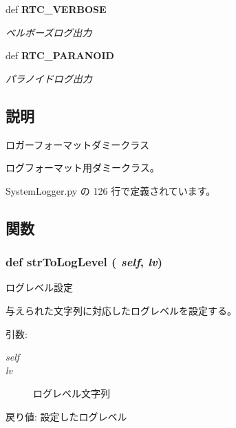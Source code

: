 \begin{CompactItemize}
def {\bf RTC\_\-VERBOSE}
\begin{CompactList}\small\item\em ベルボーズログ出力 \item\end{CompactList}\item 
def {\bf RTC\_\-PARANOID}
\begin{CompactList}\small\item\em パラノイドログ出力 \item\end{CompactList}\end{CompactItemize}


\subsection{説明}
ロガーフォーマットダミークラス 

ログフォーマット用ダミークラス。 

 SystemLogger.py の 126 行で定義されています。

\subsection{関数}
\subsubsection{\setlength{\rightskip}{0pt plus 5cm}def strToLogLevel ( {\em self},  {\em lv})}\label{classsource__py_1_1_system_logger_1_1_log_stream_23f83baef7e3405caa80a8d56c0dc1db}


ログレベル設定 

与えられた文字列に対応したログレベルを設定する。

\begin{Desc}
\item[引数:]
\begin{description}
\item[{\em self}]\item[{\em lv}]ログレベル文字列\end{description}
\end{Desc}
\begin{Desc}
\item[戻り値:]設定したログレベル \end{Desc}


